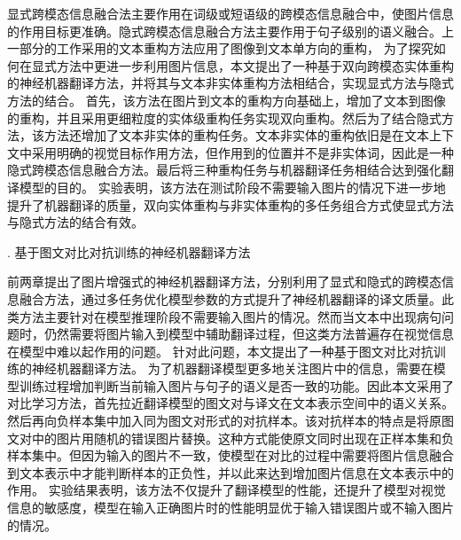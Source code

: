 显式跨模态信息融合法主要作用在词级或短语级的跨模态信息融合中，使图片信息的作用目标更准确。隐式跨模态信息融合方法主要作用于句子级别的语义融合。上一部分的工作采用的文本重构方法应用了图像到文本单方向的重构，
为了探究如何在显式方法中更进一步利用图片信息，本文提出了一种基于双向跨模态实体重构的神经机器翻译方法，并将其与文本非实体重构方法相结合，实现显式方法与隐式方法的结合。
首先，该方法在图片到文本的重构方向基础上，增加了文本到图像的重构，并且采用更细粒度的实体级重构任务实现双向重构。然后为了结合隐式方法，该方法还增加了文本非实体的重构任务。文本非实体的重构依旧是在文本上下文中采用明确的视觉目标作用方法，但作用到的位置并不是非实体词，因此是一种隐式跨模态信息融合方法。最后将三种重构任务与机器翻译任务相结合达到强化翻译模型的目的。
实验表明，该方法在测试阶段不需要输入图片的情况下进一步地提升了机器翻译的质量，双向实体重构与非实体重构的多任务组合方式使显式方法与隐式方法的结合有效。

{. 基于图文对比对抗训练的神经机器翻译方法}

前两章提出了图片增强式的神经机器翻译方法，分别利用了显式和隐式的跨模态信息融合方法，通过多任务优化模型参数的方式提升了神经机器翻译的译文质量。此类方法主要针对在模型推理阶段不需要输入图片的情况。然而当文本中出现病句问题时，仍然需要将图片输入到模型中辅助翻译过程，但这类方法普遍存在视觉信息在模型中难以起作用的问题。
针对此问题，本文提出了一种基于图文对比对抗训练的神经机器翻译方法。
为了机器翻译模型更多地关注图片中的信息，需要在模型训练过程增加判断当前输入图片与句子的语义是否一致的功能。因此本文采用了对比学习方法，首先拉近翻译模型的图文对与译文在文本表示空间中的语义关系。然后再向负样本集中加入同为图文对形式的对抗样本。该对抗样本的特点是将原图文对中的图片用随机的错误图片替换。这种方式能使原文同时出现在正样本集和负样本集中。但因为输入的图片不一致，使模型在对比的过程中需要将图片信息融合到文本表示中才能判断样本的正负性，并以此来达到增加图片信息在文本表示中的作用。
实验结果表明，该方法不仅提升了翻译模型的性能，还提升了模型对视觉信息的敏感度，模型在输入正确图片时的性能明显优于输入错误图片或不输入图片的情况。

